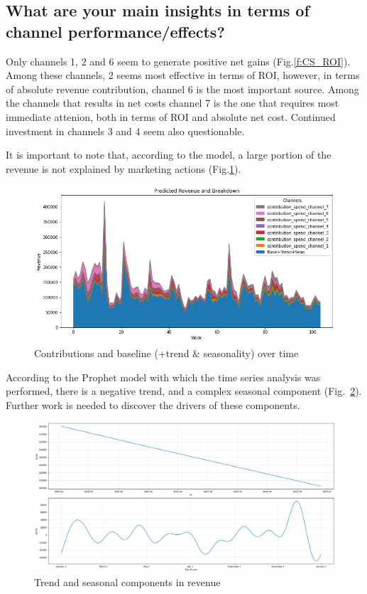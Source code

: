 \documentclass[a4paper,10pt]{scrartcl}
\begin{document}
\FloatBarrier

\subsection {What are your main insights in terms of channel performance/effects?}


Only channels 1, 2 and 6 seem to generate positive net gains (Fig.\ref{f:CS_ROI}). Among these channels, 2 seems most effective in terms of ROI, however, in terms of absolute revenue contribution, channel 6 is the most important source. Among the channels that results in net costs channel 7 is the one that requires most immediate attenion, both in terms of ROI and absolute net cost. Continued investment in channels 3 and 4 seem also questionable.

It is important to note that, according to the model, a large portion of the revenue is not explained by marketing actions (Fig.\ref{f:Conts}).
\begin{figure}[!h]
  \centering
  \includegraphics[trim=0mm 0mm 0mm 0mm, clip, width=.8\textwidth]{contributions_vs_time.png}
  \caption{Contributions and baseline (+trend \& seasonality) over time}\label{f:Conts}
\end{figure}

According to the Prophet model with which the time series analysis was performed, there is a negative trend, and a complex seasonal component (Fig.~\ref{f:TrendSeas}). Further work is needed to discover the drivers of these components.

\begin{figure}[!h]
  \centering
  \includegraphics[trim=0mm 0mm 0mm 0mm, clip, width=.8\textwidth]{trend_and_seasonality.png}
  \caption{Trend and seasonal components in revenue}\label{f:TrendSeas}
\end{figure}



%
%
\end{document}

